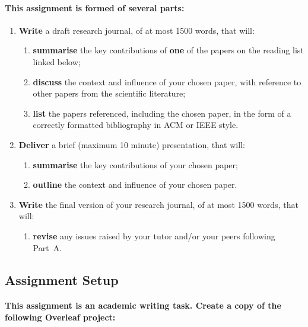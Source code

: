 \documentclass{../../fal_assignment}
\begin{document}
\paragraph{
This assignment is formed of several parts:
}

\begin{enumerate}[label=(\Alph*)]
    \item \textbf{Write} a draft research journal, of at most 1500 words, that will:
    	\begin{enumerate}[label=(\roman*)]
    		\item \textbf{summarise} the key contributions of \textbf{one} of the papers on the reading list linked below;
    		\item \textbf{discuss} the context and influence of your chosen paper, with reference to other
    			papers from the scientific literature;
    		\item \textbf{list} the papers referenced, including the chosen paper,
    			in the form of a correctly formatted bibliography in ACM or IEEE style.
    	\end{enumerate}
	\item \textbf{Deliver} a brief (maximum 10 minute) presentation, that will:
    	\begin{enumerate}[label=(\roman*)]
    		\item \textbf{summarise} the key contributions of your chosen paper;
    		\item \textbf{outline} the context and influence of your chosen paper.
    	\end{enumerate}
    \item \textbf{Write} the final version of your research journal, of at most 1500 words, that will:
    	\begin{enumerate}[label=(\roman*)]
    		\item \textbf{revise} any issues raised by your tutor and/or your peers following Part~A.
    	\end{enumerate}
\end{enumerate}

\subsection*{Assignment Setup}

\paragraph{
This assignment is an \textbf{academic writing task}. Create a copy of the following Overleaf project:
}
\end{document}
